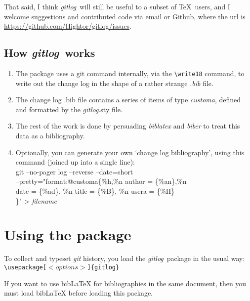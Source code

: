 \documentclass[a4paper,12pt,twoside,openany]{memoir}
\newcommand{\tcmd}[1]{\texttt{\textbackslash#1}}
\newcommand{\sfit}[1]{\textit{#1}}
\newcommand{\git}{\sfit{git}}
\newcommand{\tpname}{\sfit{gitlog}}
\begin{document}
\noindent 
That said, I think \tpname\ will still be useful to a subset of \TeX\ users,
and I welcome suggestions and contributed code via email or Github, where the url is 
\url{https://github.com/Hightor/gitlog/issues}.


\section{How \tpname\ works}
\begin{enumerate}
\item The package uses a git command internally, via the \tcmd{write18} command,
to write out the change log in the shape of a rather strange
\sfit{.bib} file.

\item The change log .bib file contains a series of items of type \sfit{customa},
  defined and formatted by the \tpname.sty file.

\item The rest of the work is done by persuading \sfit{biblatex} and \sfit{biber}
to treat this data as a bibliography.

\item Optionally, you can generate your own `change log bibliography', 
using this command (joined up into a single line):\\[\baselineskip]
{\ttfamily
git --no-pager log --reverse --date=short\\ 
--pretty="format:@customa\{\%h,\%n author = \{\%an\},\%n\\
date = \{\%ad\}, \%n title = \{\%B\}, \%n usera = \{\%H\}\\
\}" > \textit{filename}
}

\end{enumerate}

\chapter{Using the package}
\label{ch:using}
To collect and typeset \git{} history,
you load the \tpname\ package in the usual way:\\[0.5\baselineskip]
\texttt{\textbackslash usepackage[$<options>$]\{gitlog\}}

If you want to use bibLaTeX for bibliographies in the same document,
then you must load bibLaTeX before loading this package.

\end{document}
